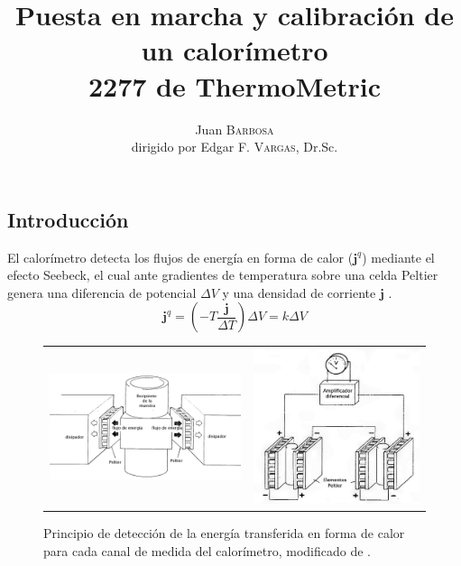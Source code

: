 \documentclass[a0]{sciposter}
\title{Puesta en marcha y calibración de un	calorímetro\\ 2277 de ThermoMetric}
\author{Juan \textsc{Barbosa}\\dirigido por Edgar F. \textsc{Vargas}, Dr.Sc.}
\institute 
{Departamento de Qu\'imica\\
	Universidad de los Andes\\
	Cra 1 N$^\circ$ 18A - 12 Bogotá, Colombia}
\begin{document}
\maketitle

\begin{multicols}{3}

\section{Introducci\'on}
	El calor\'imetro detecta los flujos de energ\'ia en forma de calor ($\mathbf{j}^q$) mediante el efecto Seebeck, el cual ante gradientes de temperatura sobre una celda Peltier genera una diferencia de potencial $\Delta V$ y una densidad de corriente $\mathbf{j}$ \cite{simon2013oxford}.
	\begin{equation}\label{eq: peltier}
		\mathbf{j}^q = \left(-T\dfrac{\mathbf{j}}{\Delta T}\right)\Delta V = k\Delta V
	\end{equation}
	
	\begin{figure}[h]
		\centering
		\begin{tabular}{cc}
			\includegraphics[width=0.59\linewidth]{../Tesis/Figures/heatFlow} & 
			\includegraphics[width=0.39\linewidth]{../Tesis/Figures/twinMeasuring}
		\end{tabular}
		\caption{Principio de detecci\'on de la energ\'ia transferida en forma de calor para cada canal de medida del calor\'imetro, modificado de \cite{Suurkuusk}.}
	\end{figure}


\end{multicols}
\end{document}
